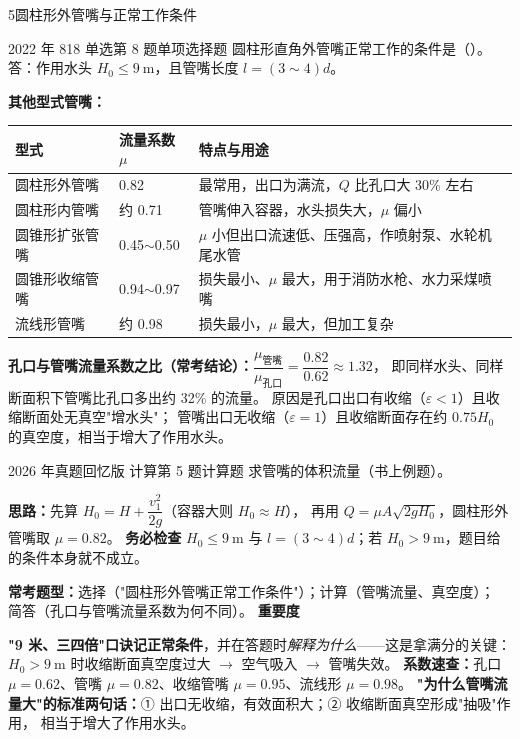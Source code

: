 \begin{kaodian}{5}{圆柱形外管嘴与正常工作条件}
\begin{zhenti}{2022 年 818 单选第 8 题}{单项选择题}
圆柱形直角外管嘴正常工作的条件是（\quad）。答：作用水头 $H_0\le9\ \mathrm{m}$，且管嘴长度 $l=(3\sim4)d$。
\end{zhenti}

\textbf{其他型式管嘴：}
\begin{center}
\begin{tabularx}{\textwidth}{@{}lXX@{}}
\toprule
型式 & 流量系数 $\mu$ & 特点与用途 \\
\midrule
圆柱形外管嘴 & 0.82 & 最常用，出口为满流，$Q$ 比孔口大 30\% 左右 \\
圆柱形内管嘴 & 约 0.71 & 管嘴伸入容器，水头损失大，$\mu$ 偏小 \\
圆锥形扩张管嘴 & 0.45$\sim$0.50 & $\mu$ 小但出口流速低、压强高，作喷射泵、水轮机尾水管 \\
圆锥形收缩管嘴 & 0.94$\sim$0.97 & 损失最小、$\mu$ 最大，用于消防水枪、水力采煤喷嘴 \\
流线形管嘴 & 约 0.98 & 损失最小，$\mu$ 最大，但加工复杂 \\
\bottomrule
\end{tabularx}
\end{center}

\textbf{孔口与管嘴流量系数之比（常考结论）：}$\dfrac{\mu_{\text{管嘴}}}{\mu_{\text{孔口}}}=\dfrac{0.82}{0.62}\approx1.32$，
即同样水头、同样断面积下管嘴比孔口多出约 32\% 的流量。
原因是孔口出口有收缩（$\varepsilon<1$）且收缩断面处无真空"增水头"；
管嘴出口无收缩（$\varepsilon=1$）且收缩断面存在约 $0.75H_0$ 的真空度，相当于增大了作用水头。

\begin{zhenti}{2026 年真题回忆版 计算第 5 题}{计算题}
求管嘴的体积流量（书上例题）。
\end{zhenti}
\noindent\textbf{思路：}先算 $H_0=H+\dfrac{v_1^2}{2g}$（容器大则 $H_0\approx H$），
再用 $Q=\mu A\sqrt{2gH_0}$，圆柱形外管嘴取 $\mu=0.82$。
\textbf{务必检查} $H_0\le9\ \mathrm{m}$ 与 $l=(3\sim4)d$；若 $H_0>9\ \mathrm{m}$，题目给的条件本身就不成立。

\textbf{常考题型：}选择（"圆柱形外管嘴正常工作条件"）；计算（管嘴流量、真空度）；
简答（孔口与管嘴流量系数为何不同）。
\textbf{重要度 }\quad{}\quad{}

\begin{banfa}
\textbf{"9 米、三四倍"口诀记正常条件}，并在答题时\emph{解释为什么}——这是拿满分的关键：
$H_0>9\ \mathrm{m}$ 时收缩断面真空度过大 $\to$ 空气吸入 $\to$ 管嘴失效。
\textbf{系数速查：}孔口 $\mu=0.62$、管嘴 $\mu=0.82$、收缩管嘴 $\mu=0.95$、流线形 $\mu=0.98$。
\textbf{"为什么管嘴流量大"的标准两句话：}① 出口无收缩，有效面积大；② 收缩断面真空形成"抽吸"作用，
相当于增大了作用水头。
\end{banfa}


\end{kaodian}
